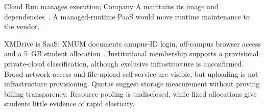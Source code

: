Cloud Run manages execution; Company A maintains its image and dependencies~\cite{container}. A managed-runtime PaaS would move runtime maintenance to the vendor.

XMDrive is SaaS: XMUM documents campus-ID login, off-campus browser access and a 5~GB student allocation~\cite{xmdrive}. Institutional membership supports a provisional private-cloud classification, although exclusive infrastructure is unconfirmed. Broad network access and file-upload self-service are visible, but uploading is not infrastructure provisioning. Quotas suggest storage measurement without proving billing transparency. Resource pooling is undisclosed, while fixed allocations give students little evidence of rapid elasticity.

